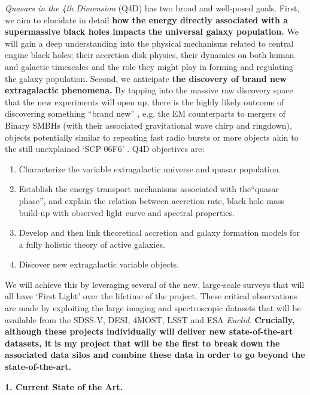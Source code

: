 \documentclass[oneside, a4paper, onecolumn, 11pt]{article}
\begin{document}
\smallskip
\smallskip
\noindent
{\it Quasars in the 4th Dimension} (Q4D) has two broad and well-posed goals. First, we aim to
elucidate in detail {\bf how the energy directly associated with a
supermassive black holes impacts the universal galaxy population.} We
will gain a deep understanding into the physical mechanisms related to
central engine black holes; their accretion disk physics, their
dynamics on both human and galactic timescales and the role they might
play in forming and regulating the galaxy population.  Second, we
anticipate {\bf the discovery of brand new extragalactic phenomena.}
By tapping into the massive raw discovery space that the new
experiments will open up, there is the highly likely outcome of
discovering something ``brand new'' \citep{Ivezic2008,
LSST_ScienceBook}, e.g. the EM counterparts to mergers of Binary SMBHs
(with their associated gravitational wave chirp and ringdown), objects
potentially similar to repeating fast radio bursts \citet{Spitler2016}
or more objects akin to the still unexplained `SCP 06F6'
\citep{Barbary2009}.  Q4D objectives are:
\begin{enumerate}
  \item Characterize the variable extragalactic universe and quasar population. 
  \item Establish the energy transport mechanisms associated with the``quasar phase'', and explain the relation between accretion rate, black hole mass build-up with observed light curve and spectral properties. 
  \item Develop and then link theoretical accretion and galaxy formation models for a fully holistic theory of active galaxies. 
  \item Discover new extragalactic variable objects. 
\end{enumerate}

\smallskip
\smallskip
\noindent
We will achieve this by leveraging several of the new, large-scale
surveys that will all have `First Light' over the lifetime of the
project.  These critical observations are made by exploiting the large
imaging and spectroscopic datasets that will be available from the
SDSS-V, DESI, 4MOST, LSST and ESA {\it Euclid}. {\bf Crucially,
although these projects individually will deliver new state-of-the-art
datasets, it is my project that will be the first to break down the
associated data silos and combine these data in order to go beyond the
state-of-the-art.}


\medskip
\medskip
\noindent
\large
{\bf{\textcolor{Cerulean}{1. Current State of the Art.}}}
\normalsize
\end{document}
